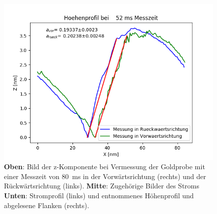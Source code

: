 \documentclass[12pt,a4paper]{article}
\begin{document}
\begin{figure}[H]
\includegraphics[scale=0.5]{Bilder/Anhang/Zeit/Profil_Zeit_52.png}
\caption{\textbf{Oben}: Bild der z-Komponente bei Vermessung der Goldprobe mit einer Messzeit von \SI{80}{ms} in der Vorwärtsrichtung (rechts) und der Rückwärtsrichtung (links). \textbf{Mitte}: Zugehörige Bilder des Stroms \textbf{Unten}: Stromprofil (links) und entnommenes Höhenprofil und abgelesene Flanken (rechts).}
\end{figure}
\end{document}

